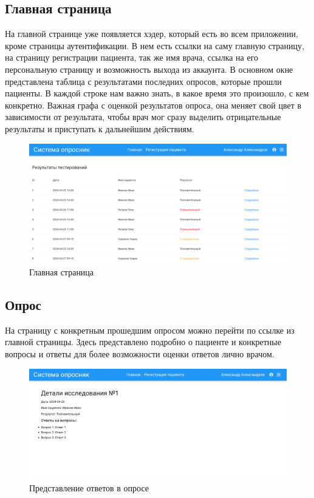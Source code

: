 \documentclass[a4paper,12pt]{article}
\begin{document}
		\subsection{Главная страница}
			На главной странице уже появляется хэдер, который есть во всем приложении, кроме страницы аутентификации.
			В нем есть ссылки на саму главную страницу, на страницу регистрации пациента, так же имя врача, ссылка на его персональную страницу и возможность выхода из аккаунта.
			В основном окне представлена таблица с результатами последних опросов, которые прошли пациенты.
			В каждой строке нам важно знать, в какое время это произошло, с кем конкретно.
			Важная графа с оценкой результатов опроса, она меняет свой цвет в зависимости от результата, чтобы врач мог сразу выделить отрицательные результаты и приступать к дальнейшим действиям.
			\begin{figure}[h]
				\includegraphics[scale=0.17]{images/screenshots/main_page}
				\caption{Главная страница}\label{fig:figure5}
			\end{figure}

		\subsection{Опрос}
			На страницу с конкретным прошедшим опросом можно перейти по ссылке из главной страницы.
			Здесь представлено подробно о пациенте и конкретные вопросы и ответы для более возможности оценки ответов лично врачом.
			\begin{figure}[h]
				\includegraphics[scale=0.17]{images/screenshots/inquirer}
				\caption{Представление ответов в опросе}\label{fig:figure6}
			\end{figure}
\end{document}
